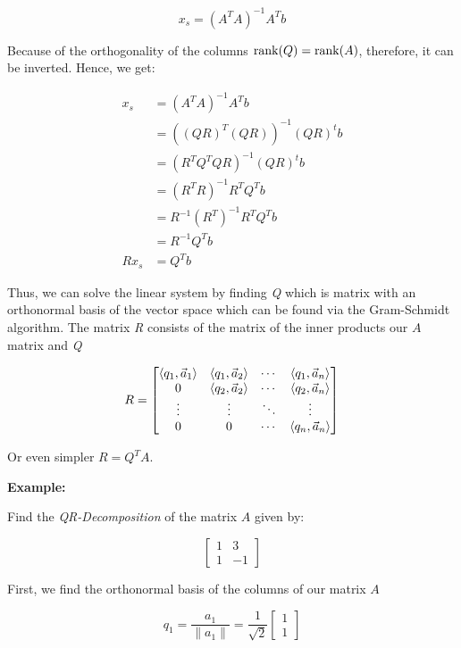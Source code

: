 \[
    x_s = (A^T A)^{-1} A^T b
\]

Because of the orthogonality of the columns \(\mathrm{rank}(Q) = \mathrm{rank}(A)\), therefore, it can be inverted. Hence,
we get:

\begin{align*}
    x_s &= (A^T A)^{-1} A^T b \\
        &= ((QR)^T (QR))^{-1} (QR)^t b \\
        &= (R^T Q^T QR)^{-1} (QR)^t b \\
        &= (R^T R)^{-1} R^T Q^T b \\
        &=  R^{-1} (R^T)^{-1} R^T Q^T b \\
        &=  R^{-1} Q^T b \\
    Rx_s&= Q^T b
\end{align*}

Thus, we can solve the linear system by finding \emph{Q} which is matrix with an orthonormal basis of the 
vector space which can be found via the Gram-Schmidt algorithm. The matrix \emph{R} consists of the matrix of the 
inner products our \(A\) matrix and \emph{Q}

\[
    R =
    \begin{bmatrix}
        \left\langle q_1, \vec{a}_1\right\rangle & \left\langle q_1, \vec{a}_2\right\rangle & \cdots &\left\langle q_1, \vec{a}_n\right\rangle \\ 
        0 & \left\langle q_2, \vec{a}_2\right\rangle & \cdots & \left\langle q_2, \vec{a}_n\right\rangle \\ 
        \vdots & \vdots  & \ddots & \vdots \\
        0 & 0  & \cdots & \left\langle q_n, \vec{a}_n\right\rangle \\ 
    \end{bmatrix}
\]

Or even simpler \(R = Q^T A\).

\textbf{Example:}

Find the \emph{QR-Decomposition} of the matrix \(A\) given by:

\[
    \begin{bmatrix}
        1 & 3 \\
        1 & -1 
    \end{bmatrix}
\]

First, we find the orthonormal basis of the columns of our matrix \(A\) 

\[ 
    q_1 = \frac{a_1}{\|a_1\|} = \frac{1}{\sqrt{2}} \begin{bmatrix} 1 \\ 1 \end{bmatrix}
\]

